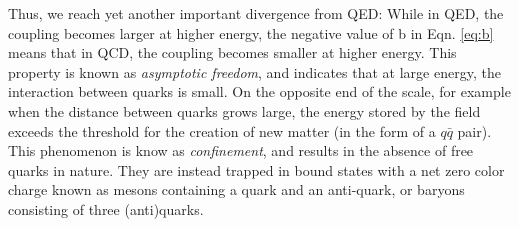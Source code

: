  Thus, we reach yet another important divergence from QED: While in QED, the coupling becomes larger at higher energy, the negative value of b in Eqn. \ref{eq:b} means that in QCD, the coupling becomes smaller at higher energy. This property is known as \textit{asymptotic freedom}, and indicates that at large energy, the interaction between quarks is small. 
  On the opposite end of the scale, for example when the distance between quarks grows large, the energy stored by the field exceeds the threshold for the creation of new matter (in the form of a $q\bar{q}$ pair). This phenomenon is know as \textit{confinement}, and results in the absence of free quarks in nature. They are instead trapped in bound states with a net zero color charge known as mesons containing a quark and an anti-quark, or baryons consisting of three (anti)quarks.

